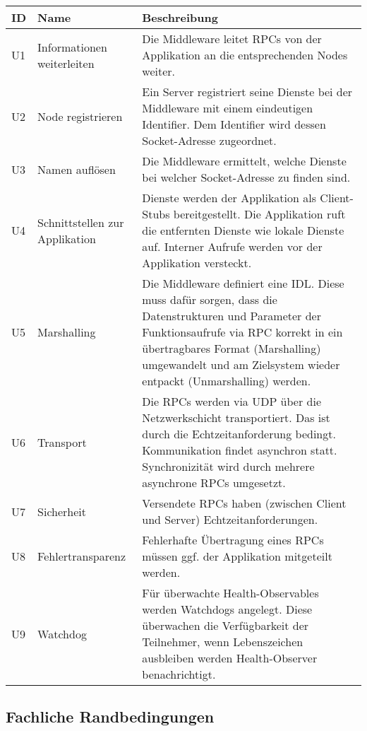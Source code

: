 \begin{tabular}{|p{1.5cm}|p{4cm}|p{8.5cm}|}
	\hline
	\textbf{ID} & \textbf{Name} & \textbf{Beschreibung} \\
	\hline
	U1 & Informationen weiterleiten & Die Middleware leitet RPCs von der Applikation an die entsprechenden Nodes weiter. \\
	\hline
	U2 & Node registrieren & Ein Server registriert seine Dienste bei der Middleware mit einem eindeutigen Identifier. Dem Identifier wird dessen Socket-Adresse zugeordnet. \\
	\hline
	U3 & Namen auflösen & Die Middleware ermittelt, welche Dienste bei welcher Socket-Adresse zu finden sind.\\
	\hline
	U4 & Schnittstellen zur Applikation & Dienste werden der Applikation als Client-Stubs bereitgestellt. Die Applikation ruft die entfernten Dienste wie lokale Dienste auf. Interner Aufrufe werden vor der Applikation versteckt. \\
	\hline
	U5 & Marshalling & Die Middleware definiert eine IDL. Diese muss dafür sorgen, dass die Datenstrukturen und Parameter der Funktionsaufrufe via RPC korrekt in ein übertragbares Format (Marshalling) umgewandelt und am Zielsystem wieder entpackt (Unmarshalling) werden. \\
	\hline
	U6 & Transport & Die RPCs werden via UDP über die Netzwerkschicht transportiert. Das ist durch die Echtzeitanforderung bedingt. Kommunikation findet asynchron statt. Synchronizität wird durch mehrere asynchrone RPCs umgesetzt.\\
	\hline 
	U7 & Sicherheit & Versendete RPCs haben (zwischen Client und Server) Echtzeitanforderungen. \\
	\hline
	U8 & Fehlertransparenz & Fehlerhafte Übertragung eines RPCs müssen ggf. der Applikation mitgeteilt werden. \\
	\hline
	U9 & Watchdog & Für überwachte Health-Observables werden Watchdogs angelegt. Diese überwachen die Verfügbarkeit der Teilnehmer, wenn Lebenszeichen ausbleiben werden Health-Observer benachrichtigt.  \\
	\hline
	
\end{tabular}

\subsection{Fachliche Randbedingungen}

